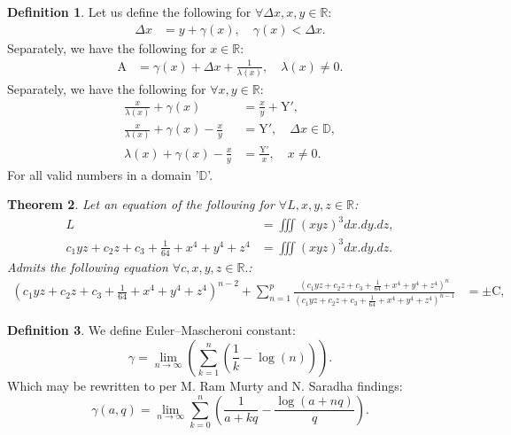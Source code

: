 \documentclass[10pt]{article}
\theoremstyle{plain}
\newtheorem{theorem}{Theorem}[section]
\theoremstyle{definition}
\newtheorem{definition}[theorem]{Definition}
\theoremstyle{remark}
\begin{document}
\begin{definition}
	Let us define the following for $\forall \Delta x, x, y \in \mathbb{R}$:
	\begin{align*}
	\Delta x &=	y + \gamma(x), \quad \gamma(x) < \Delta x.
	\end{align*}
  	Separately, we have the following for $x \in \mathbb{R}$:
	\begin{align*}
		\mathrm{A} &= \gamma(x)+\Delta x + \frac{1}{\lambda(x)}, \quad \lambda(x) \neq 0.
	\end{align*}
  Separately, we have the following  for $\forall x, y \in \mathbb{R}$:
	\begin{align*}
		\frac{x}{\lambda(x)} + \gamma(x) &= \frac{x}{y} + \mathrm{Y'},\\
		\frac{x}{\lambda(x)} + \gamma(x) - \frac{x}{y} &= \mathrm{Y'}, \quad \Delta x \in \mathbb{D},\\
		\lambda(x) + \gamma(x) -\frac{x}{y} &= \frac{\mathrm{Y'}}{x}, \quad x \neq 0.
	\end{align*}
	For all valid numbers in a domain '$\mathbb{D}$'.
\end{definition}

\begin{theorem}
	Let an equation of the following for $\forall L, x, y, z \in \mathbb{R}$:
	\begin{align*}
		L &= \iiint (x y z)^{3} dx.dy.dz,\\
		c_{1} y z + c_{2} z + c_{3} + \frac{1}{64} + x^{4} + y^{4} + z^{4} &= \iiint (x y z)^{3} dx.dy.dz.
	\end{align*}
	Admits the following equation $\forall c, x, y, z \in \mathbb{R}.$:
	\begin{align*}
		(c_{1} y z + c_{2} z + c_{3} + \frac{1}{64} + x^{4} + y^{4} + z^{4})^{n-2} + \sum_{n=1}^{p} \frac{ (c_{1} y z + c_{2} z + c_{3} + \frac{1}{64} + x^{4} + y^{4} + z^{4})^{n}}{ (c_{1} y z + c_{2} z + c_{3} + \frac{1}{64} + x^{4} + y^{4} + z^{4})^{n-1}} &= \pm \mathrm{C},
	\end{align*}
\end{theorem}

\begin{definition}
	We define Euler–Mascheroni constant:
	\begin{equation}
		\gamma = \lim_{n \to \infty}(\sum_{k=1}^{n}(\frac{1}{k}-\log(n))).
	\end{equation}
	Which may be rewritten to per M. Ram Murty and N. Saradha findings:
	\begin{equation}
		\gamma(a, q) = \lim_{n \to \infty}\sum_{k=0}^{n}(\frac{1}{a+kq}-\frac{\log(a+nq)}{q}).
	\end{equation}
\end{definition}
\end{document}
